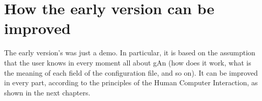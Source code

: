 \section{How the early version can be improved}
The early version's was just a demo. In particular, it is based on the assumption that the user knows in every moment all about gAn (how does it work,  what is the meaning of each field of the configuration file, and so on). It can be improved in every part, according to the principles of the Human Computer Interaction, as shown in the next chapters.

